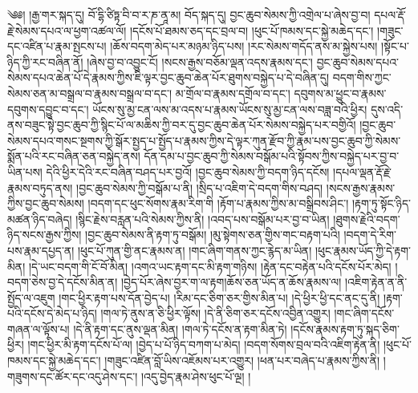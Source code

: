 \setcounter{footnote}{0} 
༄༅། །རྒྱ་གར་སྐད་དུ། བོ་དྷི་ཙིཏྟ་བི་བ་ར་ཎ་ནཱ་མ། བོད་སྐད་དུ། བྱང་ཆུབ་སེམས་ཀྱི་འགྲེལ་པ་ཞེས་བྱ་བ། དཔལ་རྡོ་རྗེ་སེམས་དཔའ་ལ་ཕྱག་འཚལ་ལོ། །དངོས་པོ་ཐམས་ཅད་དང་བྲལ་བ། །ཕུང་པོ་ཁམས་དང་སྐྱེ་མཆེད་དང་། །གཟུང་དང་འཛིན་པ་རྣམ་སྤངས་པ། །ཆོས་བདག་མེད་པར་མཉམ་ཉིད་པས། །རང་སེམས་གདོད་ནས་མ་སྐྱེས་པས། །སྟོང་པ་ཉིད་ཀྱི་རང་བཞིན་ནོ། །ཞེས་བྱ་བ་འབྱུང་ངོ། །སངས་རྒྱས་བཅོམ་ལྡན་འདས་རྣམས་དང་། བྱང་ཆུབ་སེམས་དཔའ་སེམས་དཔའ་ཆེན་པོ་དེ་རྣམས་ཀྱིས་ཇི་ལྟར་བྱང་ཆུབ་ཆེན་པོར་ཐུགས་བསྐྱེད་པ་དེ་བཞིན་དུ། བདག་གིས་ཀྱང་སེམས་ཅན་མ་བསྒྲལ་བ་རྣམས་བསྒྲལ་བ་དང་། མ་གྲོལ་བ་རྣམས་དགྲོལ་བ་དང་། དབུགས་མ་ཕྱུང་བ་རྣམས་དབུགས་དབྱུང་བ་དང་། ཡོངས་སུ་མྱ་ངན་ལས་མ་འདས་པ་རྣམས་ཡོངས་སུ་མྱ་ངན་ལས་བཟླ་བའི་ཕྱིར། དུས་འདི་ནས་བཟུང་སྟེ་བྱང་ཆུབ་ཀྱི་སྙིང་པོ་ལ་མཆིས་ཀྱི་བར་དུ་བྱང་ཆུབ་ཆེན་པོར་སེམས་བསྐྱེད་པར་བགྱིའོ། །བྱང་ཆུབ་སེམས་དཔའ་གསང་སྔགས་ཀྱི་སྒོར་སྤྱད་པ་སྤྱོད་པ་རྣམས་ཀྱིས་དེ་ལྟར་ཀུན་རྫོབ་ཀྱི་རྣམ་པས་བྱང་ཆུབ་ཀྱི་སེམས་སྨོན་པའི་རང་བཞིན་ཅན་བསྐྱེད་ནས། དོན་དམ་པ་བྱང་ཆུབ་ཀྱི་སེམས་བསྒོམ་པའི་སྟོབས་ཀྱིས་བསྐྱེད་པར་བྱ་བ་ཡིན་པས། དེའི་ཕྱིར་དེའི་རང་བཞིན་བཤད་པར་བྱའོ། །བྱང་ཆུབ་སེམས་ཀྱི་བདག་ཉིད་དངོས། །དཔལ་ལྡན་རྡོ་རྗེ་རྣམས་བཏུད་ནས། །བྱང་ཆུབ་སེམས་ཀྱི་བསྒོམ་པ་ནི། །སྲིད་པ་འཇིག་དེ་བདག་གིས་བཤད། །སངས་རྒྱས་རྣམས་ཀྱིས་བྱང་ཆུབ་སེམས། །བདག་དང་ཕུང་སོགས་རྣམ་རིག་གི །རྟོག་པ་རྣམས་ཀྱིས་མ་བསྒྲིབས་ཤིང་། །རྟག་ཏུ་སྟོང་ཉིད་མཚན་ཉིད་བཞེད། །སྙིང་རྗེས་བརླན་པའི་སེམས་ཀྱིས་ནི། །འབད་པས་བསྒོམ་པར་བྱ་བ་ཡིན། །ཐུགས་རྗེའི་བདག་ཉིད་སངས་རྒྱས་ཀྱིས། །བྱང་ཆུབ་སེམས་ནི་རྟག་ཏུ་བསྒོམ། །མུ་སྟེགས་ཅན་གྱིས་གང་བརྟག་པའི། །བདག་དེ་རིག་པས་རྣམ་དཔྱད་ན། །ཕུང་པོ་ཀུན་གྱི་ནང་རྣམས་ན། །གང་ཞིག་གནས་ཀྱང་རྙེད་མ་ཡིན། །ཕུང་རྣམས་ཡོད་ཀྱི་དེ་རྟག་མིན། །དེ་ཡང་བདག་གི་ངོ་བོ་མིན། །འགའ་ཡང་རྟག་དང་མི་རྟག་གཉིས། །རྟེན་དང་བརྟེན་པའི་དངོས་པོར་མེད། །བདག་ཅེས་བྱ་དེ་དངོས་མིན་ན། །བྱེད་པོར་ཞེས་བྱར་ག་ལ་རྟག།ཆོས་ཅན་ཡོད་ན་ཆོས་རྣམས་ལ། །འཇིག་རྟེན་ན་ནི་སྤྱོད་ལ་འཇུག །གང་ཕྱིར་རྟག་པས་དོན་བྱེད་པ། །རིམ་དང་ཅིག་ཅར་གྱིས་མིན་པ། །དེ་ཕྱིར་ཕྱི་དང་ནང་དུ་ནི། །རྟག་པའི་དངོས་དེ་མེད་པ་ཉིད། །གལ་ཏེ་ནུས་ན་ཅི་ཕྱིར་ལྟོས། །དེ་ནི་ཅིག་ཅར་དངོས་འབྱིན་འགྱུར། །གང་ཞིག་དངོས་གཞན་ལ་ལྟོས་པ། །དེ་ནི་རྟག་དང་ནུས་ལྡན་མིན། །གལ་ཏེ་དངོས་ན་རྟག་མིན་ཏེ། །དངོས་རྣམས་རྟག་ཏུ་སྐད་ཅིག་ཕྱིར། །གང་ཕྱིར་མི་རྟག་དངོས་པོ་ལ། །བྱེད་པ་པོ་ཉིད་བཀག་པ་མེད། །བདག་སོགས་བྲལ་བའི་འཇིག་རྟེན་ནི། །ཕུང་པོ་ཁམས་དང་སྐྱེ་མཆེད་དང་། །གཟུང་འཛིན་བློ་ཡིས་འཇོམས་པར་འགྱུར། །ཕན་པར་བཞེད་པ་རྣམས་ཀྱིས་ནི། །གཟུགས་དང་ཚོར་དང་འདུ་ཤེས་དང་། །འདུ་བྱེད་རྣམ་ཤེས་ཕུང་པོ་ལྔ། །
